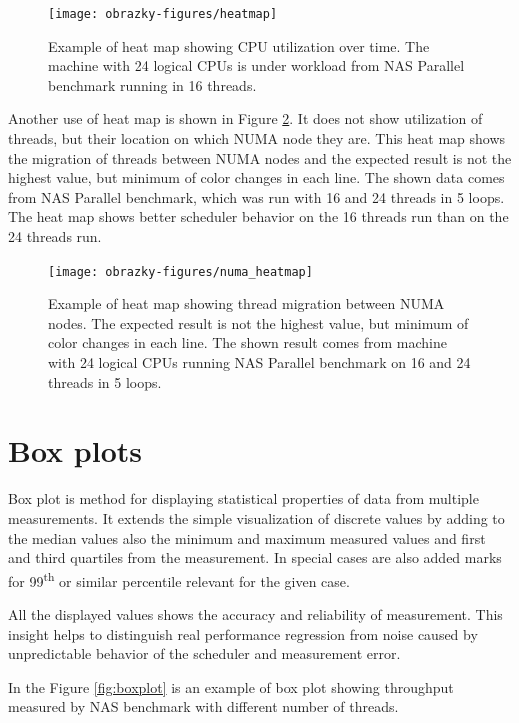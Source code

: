 \begin{figure}
  \centering
  \texttt{[image: obrazky-figures/heatmap]}
  \caption{Example of heat map showing CPU utilization over time. The machine
    with 24 logical CPUs is under workload from NAS Parallel benchmark running
    in 16 threads.}
  \label{fig:heatmap}
\end{figure}

Another use of heat map is shown in Figure \ref{fig:numa_heatmap}. It does not
show utilization of threads, but their location on which NUMA node they are.
This heat map shows the migration of threads between NUMA nodes and the expected
result is not the highest value, but minimum of color changes in each line. The
shown data comes from NAS Parallel benchmark, which was run with 16 and 24
threads in 5 loops. The heat map shows better scheduler behavior on the 16
threads run than on the 24 threads run.

\begin{figure}
  \centering
  \texttt{[image: obrazky-figures/numa\_heatmap]}
  \caption{Example of heat map showing thread migration between NUMA nodes. The
    expected result is not the highest value, but minimum of color changes in
    each line. The shown result comes from machine with 24 logical CPUs running
    NAS Parallel benchmark on 16 and 24 threads in 5 loops.}
  \label{fig:numa_heatmap}
\end{figure}

\section{Box plots}
Box plot is method for displaying statistical properties of data from multiple
measurements. It extends the simple visualization of discrete values by adding
to the median values also the minimum and maximum measured values and first and
third quartiles from the measurement. In special cases are also added marks for
99\textsuperscript{th} or similar percentile relevant for the given case.

All the displayed values shows the accuracy and reliability of measurement. This
insight helps to distinguish real performance regression from noise caused by
unpredictable behavior of the scheduler and measurement error.

In the Figure \ref{fig:boxplot} is an example of box plot showing throughput
measured by NAS benchmark with different number of threads.  

